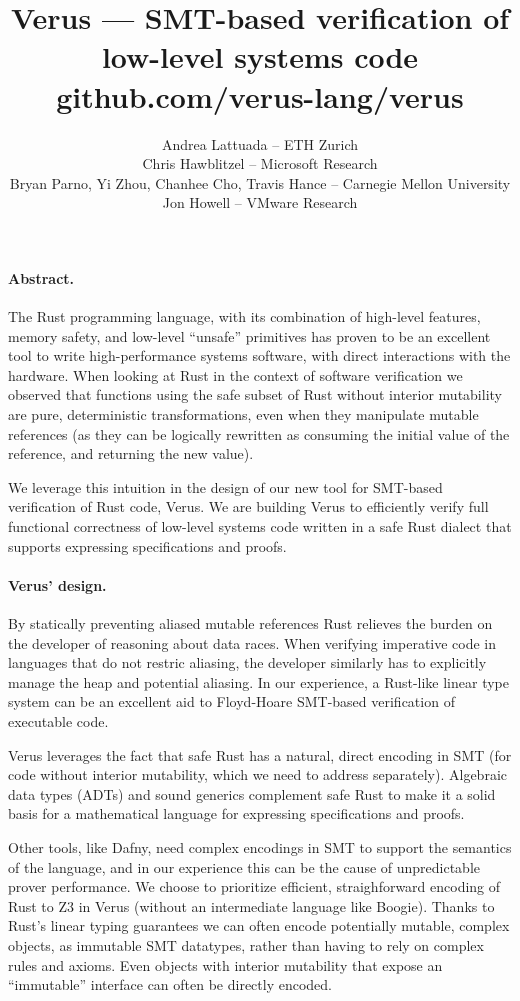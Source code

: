 \documentclass[10pt]{article}
\date{}
\title{Verus --- SMT-based verification of low-level systems code\\\small github.com/verus-lang/verus}
\author{Andrea Lattuada -- ETH Zurich \\
Chris Hawblitzel -- Microsoft Research \\
Bryan Parno, Yi Zhou, Chanhee Cho, Travis Hance -- Carnegie Mellon University \\
Jon Howell -- VMware Research}
\renewcommand{\section}[1]{\paragraph{#1.}}
\begin{document}
\maketitle

\section{Abstract}\label{abstract}

The Rust programming language, with its combination of high-level
features, memory safety, and low-level ``unsafe'' primitives has proven
to be an excellent tool to write high-performance systems software, with
direct interactions with the hardware.
When looking at Rust in the context of software verification
we observed that functions using the safe subset of Rust without
interior mutability are pure, deterministic transformations, even when
they manipulate mutable references (as they can be logically rewritten
as consuming the initial value of the reference, and returning the new
value).

We leverage this intuition in the design of our new tool for SMT-based
verification of Rust code, Verus.
We are building Verus to efficiently verify full functional correctness
of low-level systems code written in a safe Rust dialect that supports
expressing specifications and proofs.

\section{Verus' design}\label{verus-design}

By statically preventing aliased mutable references Rust
relieves the burden on the developer of reasoning about data races.
When verifying imperative code in languages that do not restric aliasing, the
developer similarly has to explicitly manage the heap and potential
aliasing. In our experience, a Rust-like linear type system can be an
excellent aid to Floyd-Hoare SMT-based verification of executable code.

Verus leverages the fact that safe Rust has a natural, direct encoding
in SMT (for code without interior mutability, which we need to address
separately). Algebraic data types (ADTs) and sound generics complement
safe Rust to make it a solid basis for a mathematical language for
expressing specifications and proofs.

Other tools, like Dafny, need complex encodings in SMT to support the
semantics of the language, and in our
experience this can be the cause of unpredictable prover performance.
We choose to prioritize efficient, straighforward encoding of Rust to Z3 in
Verus (without an intermediate language like Boogie).
Thanks to Rust's linear typing guarantees we can
often encode potentially mutable, complex objects, as immutable SMT
datatypes, rather than having to rely on complex rules and axioms. Even
objects with interior mutability that expose an ``immutable''
interface can often be directly encoded.
\end{document}
